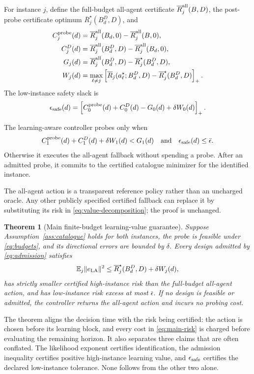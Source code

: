 \documentclass[journal]{IEEEtran}
\newtheorem{theorem}{Theorem}
\newcommand{\E}{\mathbb{E}}
\begin{document}
For instance $j$, define the full-budget all-agent certificate $\overline R_j^{\rm all}(B,D)$, the post-probe certificate optimum $\overline R_j^\star(B_d^D,D)$, and
\begin{align}
C_j^{\rm probe}(d)&=\overline R_j^{\rm all}(B_d,0)-\overline R_j^{\rm all}(B,0),\nonumber\\
C_j^D(d)&=\overline R_j^{\rm all}(B_d^D,D)-\overline R_j^{\rm all}(B_d,0),\nonumber\\
G_j(d)&=\overline R_j^{\rm all}(B_d^D,D)-\overline R_j^\star(B_d^D,D),\nonumber\\
W_j(d)&=\max_{\ell\ne j}\left[\overline R_j(a_\ell^\star;B_d^D,D)-\overline R_j^\star(B_d^D,D)\right]_+.
\label{eq:value-decomposition}
\end{align}
The low-instance safety slack is
\begin{equation}
\epsilon_{\rm safe}(d)=\left[C_0^{\rm probe}(d)+C_0^D(d)-G_0(d)+\delta W_0(d)\right]_+.
\label{eq:safety}
\end{equation}

The learning-aware controller probes only when
\begin{equation}
C_1^{\rm probe}(d)+C_1^D(d)+\delta W_1(d)<G_1(d)
\quad\text{and}\quad
\epsilon_{\rm safe}(d)\le\bar\epsilon.
\label{eq:admission}
\end{equation}
Otherwise it executes the all-agent fallback without spending a probe.
After an admitted probe, it commits to the certified catalogue minimizer for the identified instance.

The all-agent action is a transparent reference policy rather than an uncharged oracle.
Any other publicly specified certified fallback can replace it by substituting its risk in \eqref{eq:value-decomposition}; the proof is unchanged.

\begin{theorem}[Main finite-budget learning-value guarantee]
Suppose Assumption~\ref{ass:catalogue} holds for both instances, the probe is feasible under \eqref{eq:budgets}, and its directional errors are bounded by $\delta$.
Every design admitted by \eqref{eq:admission} satisfies
\begin{equation}
\E_j\|e_{\rm LA}\|^2\le \overline R_j^\star(B_d^D,D)+\delta W_j(d),
\label{eq:main-risk}
\end{equation}
has strictly smaller certified high-instance risk than the full-budget all-agent action, and has low-instance risk excess at most $\bar\epsilon$.
If no design is feasible or admitted, the controller returns the all-agent action and incurs no probing cost.
\label{thm:main}
\end{theorem}
The theorem aligns the decision time with the risk being certified: the action is chosen before its learning block, and every cost in \eqref{eq:main-risk} is charged before evaluating the remaining horizon.
It also separates three claims that are often conflated.
The likelihood exponent certifies identification, the admission inequality certifies positive high-instance learning value, and $\epsilon_{\rm safe}$ certifies the declared low-instance tolerance.
None follows from the other two alone.
\end{document}
